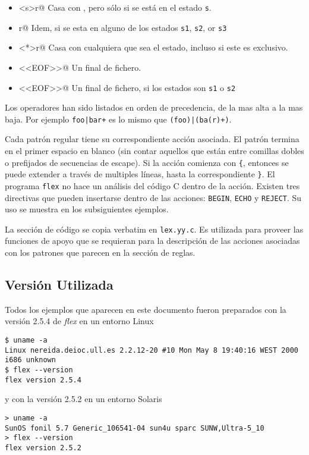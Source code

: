 \begin{itemize}
\verb@r$@	      Casa con \verb@r@, al final de una l\'{\i}nea. Este es tambi\'en un operador de \emph{trailing context}. Una regla no puede tener mas de un operador de \emph{trailing context}. Por ejemplo, la expresi\'on \verb|foo/bar$| es incorrecta.
\item
\verb@<s>r@	      Casa con \verb@r@, pero s\'olo si se est\'a en el estado \verb|s|.
\item
{}r@    Idem, si se esta en alguno de los estados \verb|s1|, \verb|s2|, or \verb|s3|
\item
\verb@<*>r@	      Casa con \verb@r@ cualquiera que sea el estado, incluso si este es exclusivo.
\item
\verb@<<EOF>>@        Un final de fichero.
\item
{}<<EOF>>@ Un final de fichero, si los estados son \verb|s1| o \verb|s2|
\end{itemize}

Los operadores han sido listados en orden de precedencia, de la
mas alta a la mas baja. Por ejemplo \verb#foo|bar+# es lo mismo que
\verb#(foo)|(ba(r)+)#.


Cada patrón regular tiene su correspondiente acción asociada. El patrón
termina en el primer espacio en blanco (sin contar aquellos que están
entre comillas dobles o prefijados de secuencias de escape).
Si la acción comienza con \verb|{|, entonces se puede extender a través
de multiples líneas, hasta la correspondiente \verb|}|.  El programa
\verb|flex|  no hace un análisis del código C dentro de la acción.
Existen tres directivas que pueden insertarse dentro de las acciones:
\verb|BEGIN|, \verb|ECHO| y \verb|REJECT|. Su uso se muestra en los
subsiguientes ejemplos.


La secci\'on de c\'odigo se copia verbatim en \verb|lex.yy.c|. Es
utilizada para proveer las funciones de apoyo que se requieran para la
descripci\'on de las acciones asociadas con los patrones que parecen en
la secci\'on de reglas.

\subsection{Versi\'on Utilizada}
Todos los ejemplos que aparecen en este documento fueron
preparados con la versi\'on 2.5.4 de \emph{flex} en un entorno
Linux 
\begin{verbatim}
$ uname -a
Linux nereida.deioc.ull.es 2.2.12-20 #10 Mon May 8 19:40:16 WEST 2000 i686 unknown
$ flex --version   
flex version 2.5.4      
\end{verbatim}
y con la versi\'on 2.5.2 en un entorno Solaris
\begin{verbatim}
> uname -a
SunOS fonil 5.7 Generic_106541-04 sun4u sparc SUNW,Ultra-5_10
> flex --version
flex version 2.5.2       
\end{verbatim}

